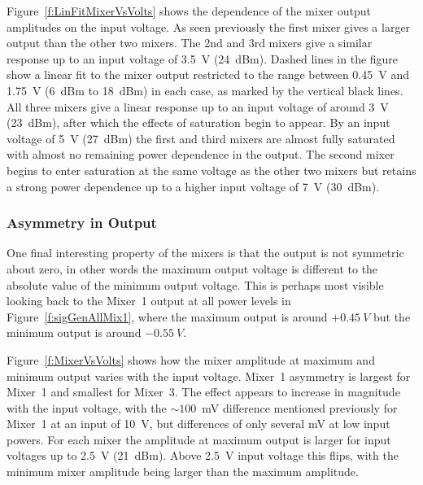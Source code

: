 Figure~\ref{f:LinFitMixerVsVolts} shows the dependence of the mixer output amplitudes on the input voltage. As seen previously the first mixer gives a larger output than the other two mixers. The 2nd and 3rd mixers give a similar response up to an input voltage of 3.5~V (24~dBm). Dashed lines in the figure show a linear fit to the mixer output restricted to the range between 0.45~V and 1.75~V (6~dBm to 18~dBm) in each case, as marked by the vertical black lines. All three mixers give a linear response up to an input voltage of around 3~V (23~dBm), after which the effects of saturation begin to appear. By an input voltage of 5~V (27~dBm) the first and third mixers are almost fully saturated with almost no remaining power dependence in the output. The second mixer begins to enter saturation at the same voltage as the other two mixers but retains a strong power dependence up to a higher input voltage of 7~V (30~dBm).


\subsubsection{Asymmetry in Output}

One final interesting property of the mixers is that the output is not symmetric about zero, in other words the maximum output voltage is different to the absolute value of the minimum output voltage. This is perhaps most visible looking back to the Mixer~1 output at all power levels in Figure~\ref{f:sigGenAllMix1}, where the maximum output is around \(+0.45~V\) but the minimum output is around \(-0.55~V\).

Figure~\ref{f:MixerVsVolts} shows how the mixer amplitude at maximum and minimum output varies with the input voltage. Mixer~1 asymmetry is largest for Mixer~1 and smallest for Mixer~3. The effect appears to increase in magnitude with the input voltage, with the \(\sim100\)~mV difference mentioned previously for Mixer~1 at an input of 10~V, but differences of only several mV at low input powers. For each mixer the amplitude at maximum output is larger for input voltages up to 2.5~V (21~dBm). Above 2.5~V input voltage this flips, with the minimum mixer amplitude being larger than the maximum amplitude.

